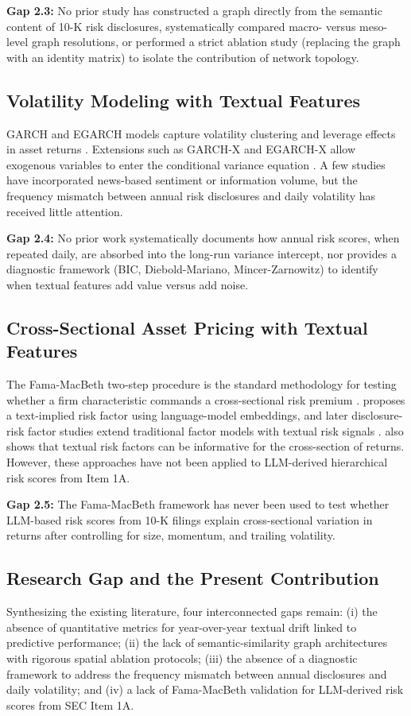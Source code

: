 \documentclass[11pt, a4paper]{article}
\begin{document}
\noindent\textbf{Gap 2.3:} No prior study has constructed a graph directly from the semantic content of 10-K risk disclosures, systematically compared macro- versus meso-level graph resolutions, or performed a strict ablation study (replacing the graph with an identity matrix) to isolate the contribution of network topology.

\subsection{Volatility Modeling with Textual Features}
GARCH and EGARCH models capture volatility clustering and leverage effects in asset returns \citep{bollerslev1986generalized, nelson1991conditional}. Extensions such as GARCH-X and EGARCH-X allow exogenous variables to enter the conditional variance equation \citep{naimoli2023realized}. A few studies have incorporated news-based sentiment or information volume, but the frequency mismatch between annual risk disclosures and daily volatility has received little attention.

\noindent\textbf{Gap 2.4:} No prior work systematically documents how annual risk scores, when repeated daily, are absorbed into the long-run variance intercept, nor provides a diagnostic framework (BIC, Diebold-Mariano, Mincer-Zarnowitz) to identify when textual features add value versus add noise.

\subsection{Cross-Sectional Asset Pricing with Textual Features}
The Fama-MacBeth two-step procedure is the standard methodology for testing whether a firm characteristic commands a cross-sectional risk premium \citep{fama1973risk}. \citet{gao2016text} proposes a text-implied risk factor using language-model embeddings, and later disclosure-risk factor studies extend traditional factor models with textual risk signals \citep{stevens2020financial}. \citet{lopezlira2019risk} also shows that textual risk factors can be informative for the cross-section of returns. However, these approaches have not been applied to LLM-derived hierarchical risk scores from Item 1A.

\noindent\textbf{Gap 2.5:} The Fama-MacBeth framework has never been used to test whether LLM-based risk scores from 10-K filings explain cross-sectional variation in returns after controlling for size, momentum, and trailing volatility.

\subsection{Research Gap and the Present Contribution}
Synthesizing the existing literature, four interconnected gaps remain: (i) the absence of quantitative metrics for year-over-year textual drift linked to predictive performance; (ii) the lack of semantic-similarity graph architectures with rigorous spatial ablation protocols; (iii) the absence of a diagnostic framework to address the frequency mismatch between annual disclosures and daily volatility; and (iv) a lack of Fama-MacBeth validation for LLM-derived risk scores from SEC Item 1A.
\end{document}
